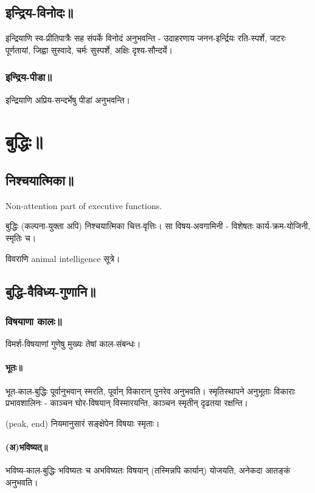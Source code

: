 \documentclass[oneside, article]{memoir}
\begin{document}
\section{इन्द्रिय-विनोदः॥}
इन्द्रियाणि स्व-प्रीतिपात्रैः सह संपर्के विनोदं अनुभवन्ति - उदाहरणाय जनन-इर्न्द्रियः रति-स्पर्शे, जटरः पूर्णतायां, जिह्वा सुस्वादे, चर्मः सुस्पर्शे, अक्षिः दृश्य-सौन्दर्ये।

\subsection{इन्द्रिय-पीडा॥}
इन्द्रियाणि अप्रिय-सन्दर्भेषु पीडां अनुभवन्ति।


\chapter{बुद्धिः॥}
\section{निश्चयात्मिका॥}
Non-attention part of executive functions.

बुद्धिः (कल्पना-युक्ता अपि) निश्चयात्मिका चित्त-वृत्तिः। सा विषय-अवगामिनी - विशेषतः कार्य-क्रम-योजिनी, स्मृतिः च।

विवराणि animal intelligence सूत्रे।

\section{बुद्धि-वैविध्य-गुणानि॥}
\subsection{विषयाणा कालः॥}
विमर्श-विषयाणां गुणेषु मुख्यः तेषां काल-संबन्धः।

\subsubsection{भूतः॥}
भूत-काल-बुद्धिः पूर्वानुभवान् स्मरति, पूर्वान् विकारान् पुनरेव अनुभवति। स्मृतिस्थापने अनुभूताः विकाराः प्रभावशालिनः - काञ्चन घोर-विषयान् विस्मारयन्ति, काञ्चन स्मृतीन् दृढतया रक्षन्ति।

(peak, end) नियमानुसारं सङ्क्षेपेन विषयाः स्मृताः।

\subsubsection{(अ)भविष्यत्॥}
भविष्य-काल-बुद्धिः भविष्यतः च अभविष्यतः विषयान् (तस्मिन्नपि कार्यान्) योजयति, अनेकदा आतङ्कं अनुभवति।
\end{document}
